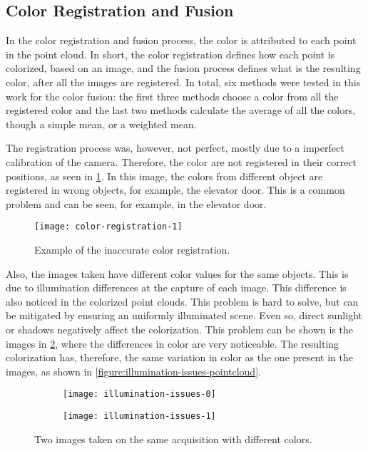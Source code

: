 \subsection{Color Registration and Fusion}

In the color registration and fusion process, the color is attributed to each point in the point cloud. In short, the color registration defines how each point is colorized, based on an image, and the fusion process defines what is the resulting color, after all the images are registered. In total, six methods were tested in this work for the color fusion: the first three methods choose a color from all the registered color and the last two methods calculate the average of all the colors, though a simple mean, or a weighted mean.

The registration process was, however, not perfect, mostly due to a imperfect calibration of the camera. Therefore, the color are not registered in their correct positions, as seen in \cref{figure:wrong-registration-photocopy}. In this image, the colors from different object are registered in wrong objects, for example, the elevator door. This is a common problem and can be seen, for example, in the elevator door.

\begin{figure}[h]
    
    \centering
    \texttt{[image: color-registration-1]}

    \caption{Example of the inaccurate color registration.}
    \label{figure:wrong-registration-photocopy}
\end{figure}

Also, the images taken have different color values for the same objects. This is due to illumination differences at the capture of each image. This difference is also noticed in the colorized point clouds. This problem is hard to solve, but can be mitigated by ensuring an uniformly illuminated scene. Even so, direct sunlight or shadows negatively affect the colorization. This problem can be shown is the images in \cref{figure:illumination-issues-images}, where the differences in color are very noticeable. The resulting colorization has, therefore, the same variation in color as the one present in the images, as shown in \cref{figure:illumination-issues-pointcloud}.

\begin{figure}[h]
    
    \centering
    \begin{subfigure}{0.5\textwidth}
        \centering
        \texttt{[image: illumination-issues-0]}
    \end{subfigure}%
    \begin{subfigure}{0.5\textwidth}
        \centering
        \texttt{[image: illumination-issues-1]}
    \end{subfigure}%

    \caption{Two images taken on the same acquisition with different colors.}
    \label{figure:illumination-issues-images}

\end{figure}

